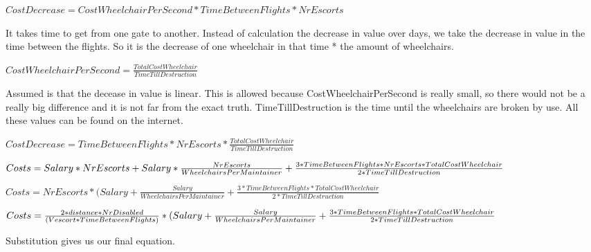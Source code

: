 \documentclass[a4paper, 12pt, notitlepage]{report}
\begin{document}
\begin{description}
	\item
	\item $CostDecrease  = CostWheelchairPerSecond * TimeBetweenFlights * NrEscorts$
	\item[Explanation:] It takes time to get from one gate to another. Instead of calculation the decrease in value over days, we take the decrease in value in the time between the flights. So it is the decrease of one wheelchair in that time * the amount of wheelchairs.
	\item $CostWheelchairPerSecond = \frac{TotalCostWheelchair}{TimeTillDestruction}$
	\item[Explanation:] Assumed is that the decease in value is linear. This is allowed because CostWheelchairPerSecond is really small, so there would not be a really big difference and it is not far from the exact truth. TimeTillDestruction is the time until the wheelchairs are broken by use. All these values can be found on the internet.
	\item $CostDecrease  = TimeBetweenFlights * NrEscorts * \frac{TotalCostWheelchair}{TimeTillDestruction}$
	\item
	\item $Costs = Salary * NrEscorts + Salary * \frac{NrEscorts}{WheelchairsPerMaintainer} \\ \\+ \frac{3* TimeBetweenFlights * NrEscorts * TotalCostWheelchair}{2*TimeTillDestruction}$
	\item $Costs = NrEscorts * (Salary + \frac{Salary}{WheelchairsPerMaintainer} + \frac{3* TimeBetweenFlights * TotalCostWheelchair}{2*TimeTillDestruction}$
	\item $Costs = \frac{2*distance*NrDisabled}{(Vescort*TimeBetweenFlights)} * \\ \\(Salary + \frac{Salary}{WheelchairsPerMaintainer} + \frac{3* TimeBetweenFlights * TotalCostWheelchair}{2*TimeTillDestruction}$
	\item[Explanation:] Substitution gives us our final equation.
	\item
\end{description}
\end{document}
